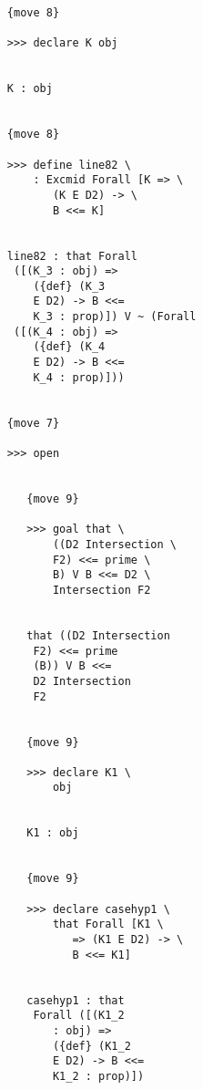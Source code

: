 \documentclass[12pt]{article}
\begin{document}
\begin{verbatim}
                        {move 8}

                        >>> declare K obj


                        K : obj


                        {move 8}

                        >>> define line82 \
                            : Excmid Forall [K => \
                               (K E D2) -> \
                               B <<= K]


                        line82 : that Forall 
                         ([(K_3 : obj) => 
                            ({def} (K_3 
                            E D2) -> B <<= 
                            K_3 : prop)]) V ~ (Forall 
                         ([(K_4 : obj) => 
                            ({def} (K_4 
                            E D2) -> B <<= 
                            K_4 : prop)]))


                        {move 7}

                        >>> open


                           {move 9}

                           >>> goal that \
                               ((D2 Intersection \
                               F2) <<= prime \
                               B) V B <<= D2 \
                               Intersection F2


                           that ((D2 Intersection 
                            F2) <<= prime 
                            (B)) V B <<= 
                            D2 Intersection 
                            F2


                           {move 9}

                           >>> declare K1 \
                               obj


                           K1 : obj


                           {move 9}

                           >>> declare casehyp1 \
                               that Forall [K1 \
                                  => (K1 E D2) -> \
                                  B <<= K1]


                           casehyp1 : that 
                            Forall ([(K1_2 
                               : obj) => 
                               ({def} (K1_2 
                               E D2) -> B <<= 
                               K1_2 : prop)])



\end{verbatim}
\end{document}
